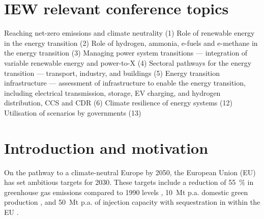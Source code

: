 \documentclass[final,5p,times,twocolumn]{elsarticle}
\let\autocite\cite
\begin{document}


\section*{ IEW relevant conference topics }
Reaching net-zero emissions and climate neutrality (1) Role of renewable energy in the energy transition (2) Role of hydrogen, ammonia, e-fuels and e-methane in the energy transition (3) Managing power system transitions --- integration of variable renewable energy and power-to-X (4) Sectoral pathways for the energy transition --- transport, industry, and buildings (5) Energy transition infrastructure --- assessment of infrastructure to enable the energy transition, including electrical transmission, storage, EV charging, and hydrogen distribution, CCS and CDR (6) Climate resilience of energy systems (12) Utilisation of scenarios by governments (13)

\section{Introduction and motivation}
\label{sec:introduction}

On the pathway to a climate-neutral Europe by 2050, the European Union (EU) has set ambitious targets for 2030. These targets include a reduction of \SI{55}{\percent} in greenhouse gas emissions compared to 1990 levels \autocite{europeancommissionFit55Delivering2021}, \SI{10}{Mt} p.a. domestic green  production \autocite{europeancommissionREPowerEUPlanCommunication2022}, and \SI{50}{Mt} p.a. of  injection capacity with sequestration in within the EU \autocite{europeanparliamentRegulationEU20242024}.
\end{document}
